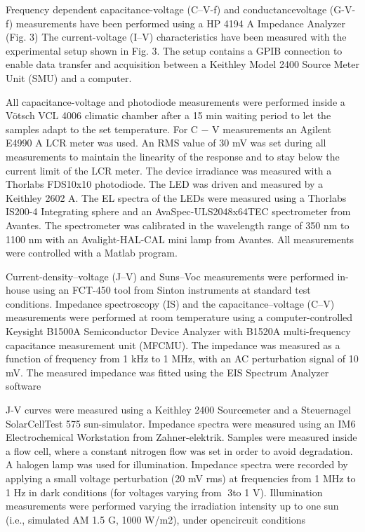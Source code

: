 \documentclass{WileyMSP-template}
\begin{document}
Frequency dependent capacitance-voltage (C–V-f) and conductancevoltage (G-V-f) measurements have been performed using a HP 4194
A Impedance Analyzer (Fig. 3)
The current-voltage (I–V) characteristics have been measured with
the experimental setup shown in Fig. 3. The setup contains a GPIB
connection to enable data transfer and acquisition between a Keithley
Model 2400 Source Meter Unit (SMU) and a computer. 

All capacitance-voltage and photodiode measurements were performed inside a Vötsch VCL
4006 climatic chamber after a 15 min waiting period to let the samples adapt to the set temperature. For C − V measurements an Agilent E4990 A LCR meter was used. An RMS
value of 30 mV was set during all measurements to maintain
the linearity of the response and to stay below the current
limit of the LCR meter. The device irradiance was measured
with a Thorlabs FDS10x10 photodiode. The LED was driven
and measured by a Keithley 2602 A. The EL spectra of the
LEDs were measured using a Thorlabs IS200-4 Integrating
sphere and an AvaSpec-ULS2048x64TEC spectrometer from
Avantes. The spectrometer was calibrated in the wavelength
range of 350 nm to 1100 nm with an Avalight-HAL-CAL mini
lamp from Avantes. All measurements were controlled with a
Matlab program.

Current-density–voltage (J–V) and Suns–Voc measurements were
performed in-house using an FCT-450 tool from Sinton instruments at
standard test conditions. Impedance spectroscopy (IS) and the capacitance–voltage (C–V) measurements were performed at room temperature using a computer-controlled Keysight B1500A Semiconductor
Device Analyzer with B1520A multi-frequency capacitance measurement unit (MFCMU). The impedance was measured as a function of
frequency from 1 kHz to 1 MHz, with an AC perturbation signal of 10
mV. The measured impedance was fitted using the EIS Spectrum
Analyzer software

J-V curves were measured using a Keithley 2400 Sourcemeter
and a Steuernagel SolarCellTest 575 sun-simulator. Impedance
spectra were measured using an IM6 Electrochemical Workstation
from Zahner-elektrik. Samples were measured inside a flow
cell, where a constant nitrogen flow was set in order to avoid
degradation. A halogen lamp was used for illumination. Impedance spectra were recorded by applying a small voltage perturbation (20 mV rms) at frequencies from 1 MHz to 1 Hz in dark
conditions (for voltages varying from 3to 1 V). Illumination
measurements were performed varying the irradiation intensity
up to one sun (i.e., simulated AM 1.5 G, 1000 W/m2), under opencircuit conditions
\end{document}
